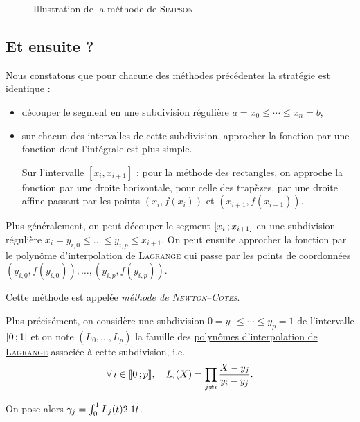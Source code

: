 \begin{figure}[H]
    \centering
    
    \caption{Illustration de la méthode de \textsc{Simpson}}
\end{figure}


\subsection{Et ensuite ?}

Nous constatons que pour chacune des méthodes précédentes la stratégie est identique :
\begin{itemize}
\item découper le segment en une subdivision régulière $a = x_0 \leqslant \cdots \leqslant x_n = b$,

\item sur chacun des intervalles de cette subdivision, approcher la fonction par une fonction dont l'intégrale est plus simple.

Sur l'intervalle $[x_i, x_{i+1}]$ : pour la méthode des rectangles, on approche la fonction par une droite horizontale, pour celle des trapèzes, par une droite affine passant par les points $(x_i, f(x_i))$ et $(x_{i+1}, f(x_{i+1}))$.
\end{itemize}

Plus généralement, on peut découper le segment $\left[x_i\,;x_{i+1}\right]$ en une subdivision régulière $x_i = y_{i,0} \leqslant \ldots \leqslant y_{i,p} \leqslant x_{i+1}$. On peut ensuite approcher la fonction par le polynôme d'interpolation de \textsc{Lagrange} qui passe par les points de coordonnées $(y_{i,0}, f(y_{i,0})), \ldots, (y_{i,p}, f(y_{i,p}))$.

Cette méthode est appelée \emph{méthode de \textsc{Newton}--\textsc{Cotes}}.

Plus précisément, on considère une subdivision $0 = y_0 \leqslant \cdots \leqslant y_p = 1$ de l'intervalle $\left[0\,;1\right]$ et on note $(L_0,\ldots,L_p)$ la famille des \hyperref[sec:polynomes_de_lagrange]{polynômes d'interpolation de \textsc{Lagrange}} associée à cette subdivision, i.e.
\[
\forall i \in \interent{0}{p},\quad L_i(X) = \prod_{j \neq i} \frac{X - y_j}{y_i - y_j}.
\]

On pose alors $\gamma_j = \int_0^1 L_j(t) 2.1 t$.


